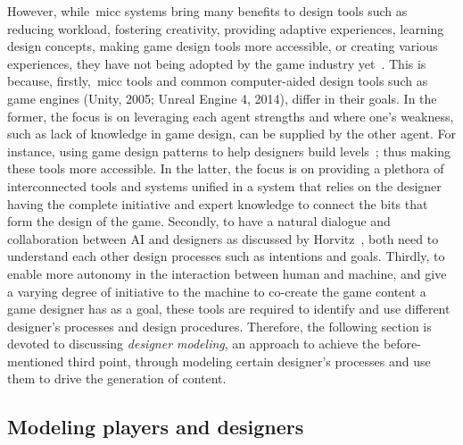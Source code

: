 However, while~\acrshort{micc} systems bring many benefits to design tools such as reducing workload, fostering creativity, providing adaptive experiences, learning design concepts, making game design tools more accessible, or creating various experiences, they have not being adopted by the game industry yet~\cite{partlan_design-driven_2021}. This is because, firstly,~\acrshort{micc} tools and common computer-aided design tools such as game engines (Unity, 2005; Unreal Engine 4, 2014), differ in their goals. In the former, the focus is on leveraging each agent strengths and where one's weakness, such as lack of knowledge in game design, can be supplied by the other agent. For instance, using game design patterns to help designers build levels~\cite{baldwin_mixed-initiative_2017,dahlskog_procedural_2014}; thus making these tools more accessible. In the latter, the focus is on providing a plethora of interconnected tools and systems unified in a system that relies on the designer having the complete initiative and expert knowledge to connect the bits that form the design of the game. Secondly, to have a natural dialogue and collaboration between AI and designers as discussed by Horvitz~\cite{horvitz_uncertainty_1999}, both need to understand each other design processes such as intentions and goals. Thirdly, to enable more autonomy in the interaction between human and machine, and give a varying degree of initiative to the machine to co-create the game content a game designer has as a goal, these tools are required to identify and use different designer's processes and design procedures. Therefore, the following section is devoted to discussing \emph{designer modeling}, an approach to achieve the before-mentioned third point, through modeling certain designer's processes and use them to drive the generation of content. 

\subsection{Modeling players and designers}


